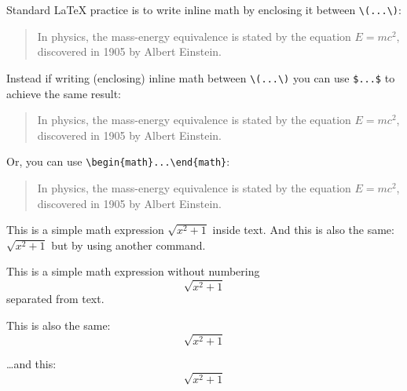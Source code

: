 \documentclass{article}
\begin{document}
\noindent Standard \LaTeX{} practice is to write inline math by enclosing it between \verb|\(...\)|:

\begin{quote}
  In physics, the mass-energy equivalence is stated
  by the equation \(E=mc^2\), discovered in 1905 by Albert Einstein.
\end{quote}

\noindent Instead if writing (enclosing) inline math between \verb|\(...\)| you can use \texttt{\$...\$} to achieve the same result:

\begin{quote}
  In physics, the mass-energy equivalence is stated
  by the equation $E=mc^2$, discovered in 1905 by Albert Einstein.
\end{quote}

\noindent Or, you can use \verb|\begin{math}...\end{math}|:

\begin{quote}
  In physics, the mass-energy equivalence is stated
  by the equation \begin{math}E=mc^2\end{math}, discovered in 1905 by Albert Einstein.
\end{quote}

This is a simple math expression \(\sqrt{x^2+1}\) inside text. 
And this is also the same: 
\begin{math}
\sqrt{x^2+1}
\end{math}
but by using another command.

This is a simple math expression without numbering
\[\sqrt{x^2+1}\] 
separated from text.

This is also the same:
\begin{displaymath}
\sqrt{x^2+1}
\end{displaymath}

\ldots and this:
\begin{equation*}
\sqrt{x^2+1}
\end{equation*}
\end{document}

